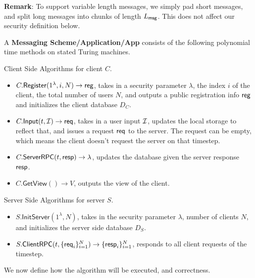 \textbf{Remark}:  To support variable length messages, we simply pad short messages, and split long messages into chunks of length $L_{\mathsf{msg}}$. This does not affect our security definition below.
\begin{definition}
\label{def:messaging-scheme}
A \textbf{Messaging Scheme/Application/App} consists of the following polynomial time methods on stated Turing machines.

Client Side Algorithms for client $C$.
\begin{itemize}
    \item $C.\mathsf{Register}(1^{\lambda}, i, N) \to \mathsf{reg}$, takes in a security parameter $\lambda$, the index $i$ of the client, the total number of users $N$, and outputs a public registration info $\mathsf{reg}$ and initializes the client database $D_C$.
    
    \item $C.\mathsf{Input}(t, \mathcal{I}) \to \mathsf{req}$, takes in a user input $\mathcal{I}$, updates the local storage to reflect that, and issues a request $\mathsf{req}$ to the server. The request can be empty, which means the client doesn't request the server on that timestep.
    
    \item $C.\mathsf{ServerRPC}(t, \mathsf{resp})\to \lambda$, updates the database given the server response $\mathsf{resp}$.
    
    \item $C.\mathsf{GetView}() \to V$, outputs the view of the client.
\end{itemize}

Server Side Algorithms for server $S$.

\begin{itemize}
    \item $S.\mathsf{InitServer}(1^{\lambda}, N)$, takes in the security parameter $\lambda$, number of clients $N$, and initializes the server side database $D_S$.
    \item $S.\mathsf{ClientRPC}(t, \{\mathsf{req}_i\}_{i = 1}^N) \to \{\mathsf{resp}_i\}_{i = 1}^N$, responds to all client requests of the timestep.
\end{itemize}
\end{definition}
We now define how the algorithm will be executed, and correctness.
